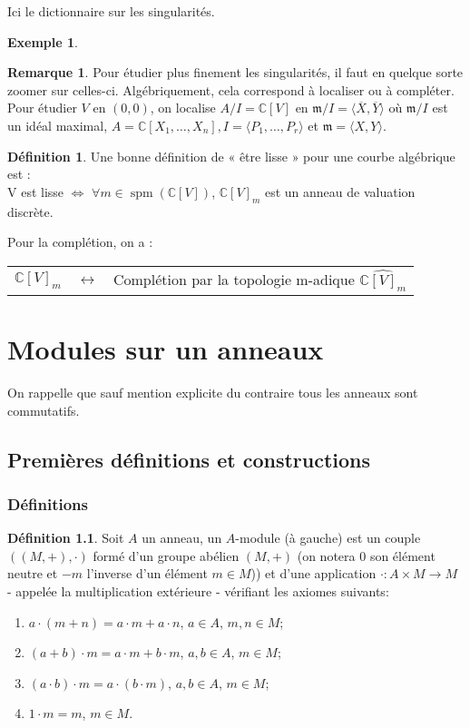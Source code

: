 \documentclass[a4paper, oneside, 12pt]{book}
\theoremstyle{theoremeStyle} %
\theoremstyle{definition} %
\newtheorem{definition}[theoreme]{Définition}
\newtheorem{remarque}[theoreme]{Remarque}
\newtheorem{exemple}[theoreme]{Exemple}
\DeclareMathOperator{\spm}{spm}
\newcommand{\CC}{\mathbb{C}}
\begin{document}
Ici le dictionnaire sur les singularités.

\begin{exemple}
  
\end{exemple}

\begin{remarque}
  Pour étudier plus finement les singularités, il faut en quelque
  sorte zoomer sur celles-ci. Algébriquement, cela correspond à
  localiser ou à compléter.
  Pour étudier $V$ en $(0,0)$, on localise $A/I=\CC[V]$ en
  $\mathfrak{m}/I=\langle \overline{X},\overline{Y}\rangle$ où
  $\mathfrak{m}/I$ est un idéal maximal, $A=\CC[X_1,\dotsc,X_n],
  I=\langle P_1,\dotsc,P_r\rangle$ et $\mathfrak{m}=\langle
  X,Y\rangle$. %
\end{remarque}

\begin{definition}
  Une bonne définition de « être lisse » pour une courbe algébrique est : \\
  V est lisse $\iff$ $\forall m\in \spm(\CC[V])$, $\CC[V]_m$ est un anneau de valuation discrète.
\end{definition}
Pour la complétion, on a :
\begin{table}[h]
  \centering
  \begin{tabular}[h]{ccc}
     $\CC[V]_m$ & $\leftrightarrow$ & Complétion par la topologie m-adique $\widehat{\CC[V]_m}$
  \end{tabular}
\end{table}

\part{Modules sur un anneaux}
 On rappelle que sauf mention explicite du contraire tous les anneaux sont commutatifs.
\chapter{Premières définitions et constructions}
\section{Définitions}
\begin{definition}Soit $A$ un anneau, un $A$-module (à gauche) est un couple $((M,+),\cdot)$ formé d'un groupe abélien  $(M,+)$ (on notera $0$ son élément neutre et $-m$ l'inverse d'un élément $m\in M$)) et d'une application $ \cdot :A\times M\to M$ - appelée la multiplication extérieure -  vérifiant les axiomes suivants:
\begin{enumerate}
\item $a\cdot (m+n)=a\cdot m+a\cdot n $, $a\in A$, $m,n\in M$;
\item $(a+b)\cdot m=a\cdot m+b\cdot m$, $a,b\in A$, $m\in M$;
\item $(a\cdot b)\cdot m=a\cdot (b\cdot m)$, $a,b\in A$, $m\in M$;
\item $1\cdot m=m$, $m\in M$. \\
\end{enumerate}
\end{definition}
\end{document}
